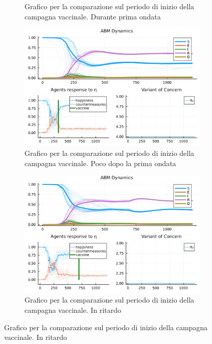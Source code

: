 \begin{figure}[!hb]
\begin{subfigure}[b]{0.45\textwidth}
		\caption{Grafico per la comparazione sul periodo di inizio della campagna vaccinale. Durante prima ondata}
		\label{fig:comparison_all_2}
	\end{subfigure}
	\hfill
	\begin{subfigure}[b]{0.45\textwidth}
		\centering
		\includegraphics[width=\textwidth]{img/SocialNetworkABM_4_A.jpg}
		\caption{Grafico per la comparazione sul periodo di inizio della campagna vaccinale. Poco dopo la prima ondata}
		\label{fig:comparison_all_3}
	\end{subfigure}
	\hfill
	\begin{subfigure}[b]{0.45\textwidth}
		\centering
		\includegraphics[width=\textwidth]{img/SocialNetworkABM_2_A.jpg}
		\caption{Grafico per la comparazione sul periodo di inizio della campagna vaccinale. In ritardo}
		\label{fig:comparison_all_4}
	\end{subfigure}
\end{figure}
\newpage


